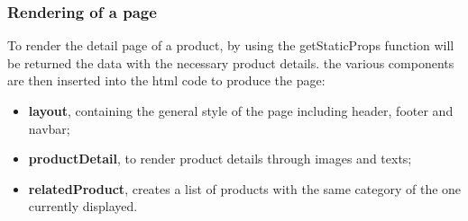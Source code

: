 \subsubsection{Rendering of a page}
To render the detail page of a product, by using the getStaticProps function will be returned the data with the necessary product details. the various components are then inserted into the html code to produce the page:
\begin{itemize}
  \item \textbf{layout}, containing the general style of the page including header, footer and navbar;
  \item \textbf{productDetail}, to render product details through images and texts;
  \item \textbf{relatedProduct}, creates a list of products with the same category of the one currently displayed.
\end{itemize}
